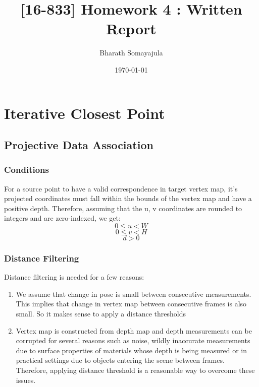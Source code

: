 \documentclass[12pt, a4paper]{article}
\title{[16-833] Homework 4 : Written Report}
\author{Bharath Somayajula}
\date{\today}
\begin{document}
\maketitle

\tableofcontents

\section{Iterative Closest Point}
\subsection{Projective Data Association}
\subsubsection{Conditions}
For a source point to have a valid correspondence in target vertex map, it's projected coordinates must fall within the bounds of the vertex map and have a positive depth. Therefore, assuming that the u, v coordinates are rounded to integers and are zero-indexed, we get:
\[0 \leq  u < W\]
\[0 \leq  v < H\]
\[d > 0\]

\subsubsection{Distance Filtering}
Distance filtering is needed for a few reasons:
\begin{enumerate}
  \item We assume that change in pose is small between consecutive measurements. This implies that change in vertex map between consecutive frames is also small. So it makes sense to apply a distance thresholds
  \item Vertex map is constructed from depth map and depth measurements can be corrupted for several reasons such as noise, wildly inaccurate measurements due to surface properties of materials whose depth is being measured or in practical settings due to objects entering the scene between frames. Therefore, applying distance threshold is a reasonable way to overcome these issues.
\end{enumerate}
\end{document}
